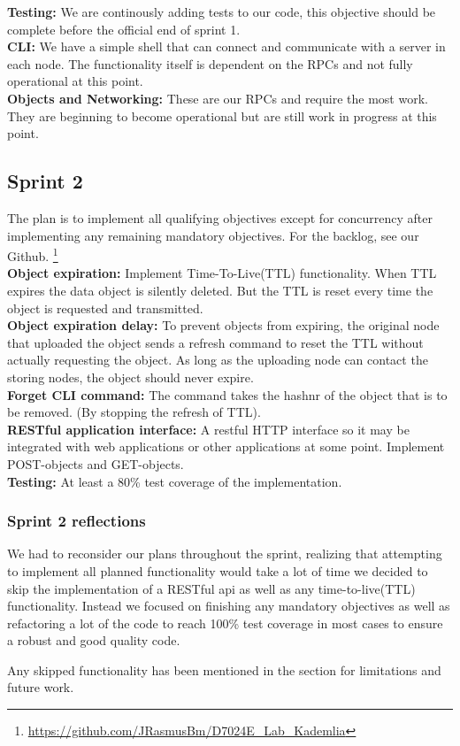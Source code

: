 \textbf{Testing:} We are continously adding tests to our code,
this objective should be complete before the official end of sprint 1.\\

\textbf{CLI:} We have a simple shell that can connect and communicate
with a server in each node. The functionality itself is dependent on
the RPCs and not fully operational at this point.\\

\textbf{Objects and Networking:} These are our RPCs and require the
most work. They are beginning to become operational but are still
work in progress at this point.

\newpage

\subsection{Sprint 2}\label{sec:sprint-2}
The plan is to implement all qualifying objectives except for
concurrency after implementing any remaining mandatory objectives.
For the backlog, see our Github.
\footnote{\href{https://github.com/JRasmusBm/D7024E_Lab_Kademlia}
{https://github.com/JRasmusBm/D7024E\_Lab\_Kademlia}}\\

\textbf{Object expiration:} Implement Time-To-Live(TTL) functionality.
When TTL expires the data object is silently deleted. But the TTL is
reset every time the object is requested and transmitted.\\

\textbf{Object expiration delay:} To prevent objects from expiring,
the original node that uploaded the object sends a refresh command
to reset the TTL without actually requesting the object. As long
as the uploading node can contact the storing nodes, the object
should never expire.\\

\textbf{Forget CLI command:} The command takes the hashnr of the
object that is to be removed. (By stopping the refresh of TTL).\\

\textbf{RESTful application interface:} A restful HTTP interface
so it may be integrated with web applications or other applications
at some point. Implement POST-objects and GET-objects.\\

\textbf{Testing:} At least a 80\% test coverage of the implementation.

\subsubsection{Sprint 2 reflections}\label{sec:sprint-2-reflections}
We had to reconsider our plans throughout the sprint, realizing
that attempting to implement all planned functionality would
take a lot of time we decided to skip the implementation of a
RESTful api as well as any time-to-live(TTL) functionality.
Instead we focused on finishing any mandatory objectives as well
as refactoring a lot of the code to reach 100\%
test coverage in most cases to ensure a robust and good quality code.

Any skipped functionality has been mentioned in the section for
limitations and future work.
